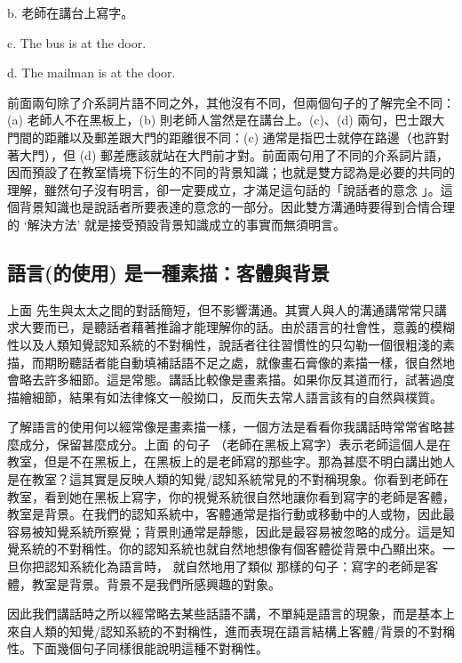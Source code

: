 b.  老師在講台上寫字。

c.  The bus is at the door.

d.  The mailman is at the door.

前面兩句除了介系詞片語不同之外，其他沒有不同，但兩個句子的了解完全不同：(a) 老師人不在黑板上，(b) 則老師人當然是在講台上。(c)、(d) 兩句，巴士跟大門間的距離以及郵差跟大門的距離很不同：(c) 通常是指巴士就停在路邊（也許對著大門），但 (d) 郵差應該就站在大門前才對。前面兩句用了不同的介系詞片語，因而預設了在教室情境下衍生的不同的背景知識；也就是雙方認為是必要的共同的理解，雖然句子沒有明言，卻一定要成立，才滿足這句話的「說話者的意念 」。這個背景知識也是說話者所要表達的意念的一部分。因此雙方溝通時要得到合情合理的 ‘解決方法’ 就是接受預設背景知識成立的事實而無須明言。

\subsection{語言(的使用) 是一種素描：客體與背景} %

上面  先生與太太之間的對話簡短，但不影響溝通。其實人與人的溝通講常常只講求大要而已，是聽話者藉著推論才能理解你的話。由於語言的社會性，意義的模糊性以及人類知覺認知系統的不對稱性，說話者往往習慣性的只勾勒一個很粗淺的素描，而期盼聽話者能自動填補話語不足之處，就像畫石膏像的素描一樣，很自然地會略去許多細節。這是常態。講話比較像是畫素描。如果你反其道而行，試著過度描繪細節，結果有如法律條文一般拗口，反而失去常人語言該有的自然與樸質。

了解語言的使用何以經常像是畫素描一樣，一個方法是看看你我講話時常常省略甚麼成分，保留甚麼成分。上面  的句子 （老師在黑板上寫字）表示老師這個人是在教室，但是不在黑板上，在黑板上的是老師寫的那些字。那為甚麼不明白講出她人是在教室？這其實是反映人類的知覺/認知系統常見的不對稱現象。你看到老師在教室，看到她在黑板上寫字，你的視覺系統很自然地讓你看到寫字的老師是客體，教室是背景。在我們的認知系統中，客體通常是指行動或移動中的人或物，因此最容易被知覺系統所察覺；背景則通常是靜態，因此是最容易被忽略的成分。這是知覺系統的不對稱性。你的認知系統也就自然地想像有個客體從背景中凸顯出來。一旦你把認知系統化為語言時， 就自然地用了類似  那樣的句子：寫字的老師是客體，教室是背景。背景不是我們所感興趣的對象。

因此我們講話時之所以經常略去某些話語不講，不單純是語言的現象，而是基本上來自人類的知覺/認知系統的不對稱性，進而表現在語言結構上客體/背景的不對稱性。下面幾個句子同樣很能說明這種不對稱性。

\ea%
\label{ex:key:14}
\gll\\
\\
\glt
\z

